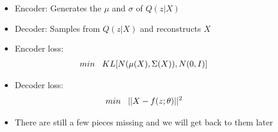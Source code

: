 \begin{frame}
\begin{columns}
\begin{overlayarea}{\textwidth}{\textheight}
		\end{overlayarea}
		\begin{overlayarea}{\textwidth}{\textheight}
			\begin{itemize}\justifying
				\item<1-> Encoder: Generates the $\mu$ and $\sigma$ of $Q(z|X)$
				\item<2-> Decoder: Samples from $Q(z|X)$ and reconstructs $X$
				\item<3-> Encoder loss: 
				\begin{align*}
				min \hspace{3mm}KL[N(\mu(X), \Sigma(X)), N(0, I)]
				\end{align*}
				\item<4-> Decoder loss: 
				\begin{align*}
				min \hspace{3mm}||X - f(z; \theta)||^2
				\end{align*}
				\item<5-> There are still a few pieces missing and we will get back to them later
			\end{itemize}
		\end{overlayarea}
	\end{columns}
\end{frame}


